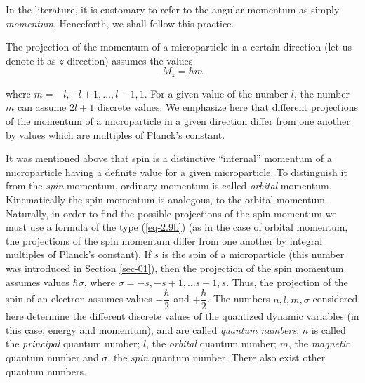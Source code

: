 \documentclass[a4paper,sfsidenotes,colorlinks=true]{tufte-book}
\numberwithin{equation}{section}
\numberwithin{figure}{section}
\begin{document}
In the literature, it is customary to refer to the angular momentum as
simply \emph{momentum}, Henceforth, we shall follow this practice.

The projection of the momentum of a microparticle in a certain
direction (let us denote it as $z$-direction) assumes the values 
\begin{equation}%
 M_{z}= \hbar m
\tag{2.9b}
\label{eq-2.9b} 
\end{equation}

where $m=-l,-l+1, \ldots ,l-1,1$. For a given value of the number $l$,
the number $m$ can assume $2l + 1$ discrete values. We emphasize here
that different projections of the momentum of a microparticle in a
given direction differ from one another by values which are multiples
of Planck's constant.

It was mentioned above that spin is a distinctive ``internal''
momentum of a microparticle having a definite value for a given
microparticle. To distinguish it from the \emph{spin} momentum,
ordinary momentum is called \emph{orbital} momentum. Kinematically the
spin momentum is analogous, to the orbital momentum. Naturally, in
order to find the possible projections of the spin momentum we must
use a formula of the type (\ref{eq-2.9b}) (as in the case of orbital
momentum, the projections of the spin momentum differ from one another
by integral multiples of Planck's constant). If $s$ is the spin of a
microparticle (this number was introduced in Section \ref{sec-01}),
then the projection of the spin momentum assumes values $\hbar
\sigma$, where $\sigma = -s,-s+1, \ldots s- 1, s $. Thus, the
projection of the spin of an electron assumes values $-
\dfrac{\hbar}{2}$ and $+ \dfrac{\hbar}{2}$. The numbers $n, l, m,
\sigma$ considered here determine the different discrete values of the
quantized dynamic variables (in this case, energy and momentum), and
are called \emph{quantum numbers}; $n$ is called the \emph{principal}
quantum number; $l$, the \emph{orbital} quantum number; $m$, the
\emph{magnetic} quantum number and $\sigma$, the \emph{spin} quantum
number. There also exist other quantum numbers.
\end{document}
